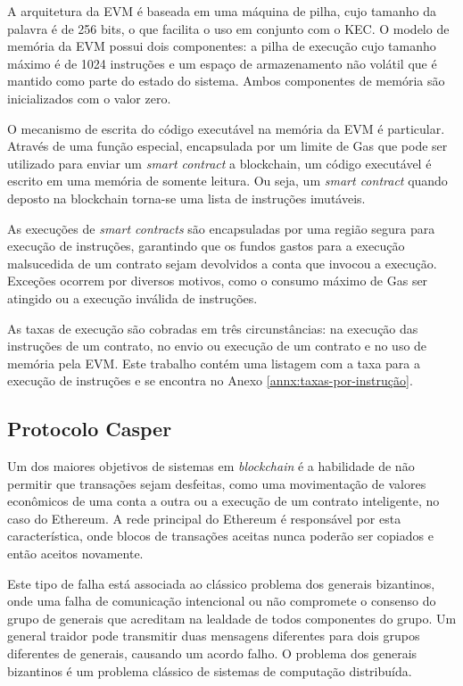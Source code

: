 \documentclass[tcc,capa]{texufpel}
\begin{document}
	A arquitetura da EVM é baseada em uma máquina de pilha, cujo tamanho da palavra é de 256 bits, o que facilita o uso em conjunto com o KEC. O modelo de memória da EVM possui dois componentes: a pilha de execução cujo tamanho máximo é de 1024 instruções e um espaço de armazenamento não volátil que é mantido como parte do estado do sistema. Ambos componentes de memória são inicializados com o valor zero.
	
	O mecanismo de escrita do código executável na memória da EVM é particular. Através de uma função especial, encapsulada por um limite de Gas que pode ser utilizado para enviar um \textit{smart contract} a blockchain, um código executável é escrito em uma memória de somente leitura. Ou seja, um \textit{smart contract} quando deposto na blockchain torna-se uma lista de instruções imutáveis.
	
	As execuções de \textit{smart contracts} são encapsuladas por uma região segura para execução de instruções, garantindo que os fundos gastos para a execução malsucedida de um contrato sejam devolvidos a conta que invocou a execução. Exceções ocorrem por diversos motivos, como o consumo máximo de Gas ser atingido ou a execução inválida de instruções.
	
	As taxas de execução são cobradas em três circunstâncias: na execução das instruções de um contrato, no envio ou execução de um contrato e no uso de memória pela EVM. Este trabalho contém uma listagem com a taxa para a execução de instruções e se encontra no Anexo \ref{annx:taxas-por-instrução}.
  
    
    \subsection{Protocolo Casper}
    
    Um dos maiores objetivos de sistemas em \textit{blockchain} é a habilidade de não permitir que transações sejam desfeitas, como uma movimentação de valores econômicos de uma conta a outra ou a execução de um contrato inteligente, no caso do Ethereum. A rede principal do Ethereum é responsável por esta característica, onde blocos de transações aceitas nunca poderão ser copiados e então aceitos novamente.
    
    Este tipo de falha está associada ao clássico problema dos generais bizantinos, onde uma falha de comunicação intencional ou não compromete o consenso do grupo de generais que acreditam na lealdade de todos componentes do grupo. Um general traidor pode transmitir duas mensagens diferentes para dois grupos diferentes de generais, causando um acordo falho. O problema dos generais bizantinos é um problema clássico de sistemas de computação distribuída.
    
\end{document}
